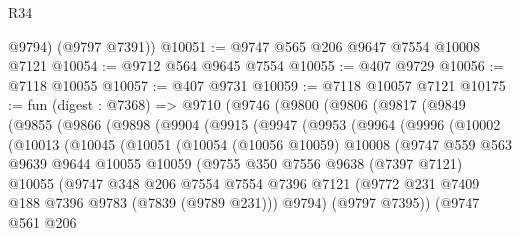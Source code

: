 \begin{lexlean}{R34}
\begin{coremodule}
        @9794)
      (@9797 @7391))
@10051 := @9747 @565 @206 @9647 @7554 @10008 @7121
@10054 := @9712 @564 @9645 @7554
@10055 := @407 @9729
@10056 := @7118 @10055
@10057 := @407 @9731
@10059 := @7118 @10057 @7121
@10175 := fun (digest : @7368) =>
  @9710
    (@9746
      (@9800
        (@9806
          (@9817
            (@9849
              (@9855
                (@9866
                  (@9898
                    (@9904
                      (@9915
                        (@9947
                          (@9953
                            (@9964
                              (@9996
                                (@10002
                                  (@10013
                                    (@10045
                                      (@10051
                                        (@10054
                                          (@10056 @10059)
                                          @10008
                                          (@9747
                                            @559
                                            @563
                                            @9639
                                            @9644
                                            @10055
                                            @10059
                                            (@9755
                                              @350
                                              @7556
                                              @9638
                                              (@7397 @7121)
                                              @10055
                                              (@9747
                                                @348
                                                @206
                                                @7554
                                                @7554
                                                @7396
                                                @7121
                                                (@9772
                                                  @231
                                                  @7409
                                                  @188
                                                  @7396
                                                  @9783
                                                  (@7839 (@9789 @231)))
                                                @9794)
                                              (@9797 @7395))
                                            (@9747
                                              @561
                                              @206

\end{coremodule}
\end{lexlean}

